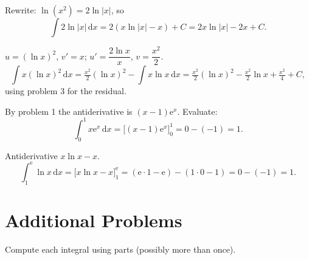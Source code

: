 \begin{solutions}
  \item Rewrite: $\ln(x^{2})=2\ln|x|$, so
        \[
          \int 2\ln|x|\,\mathrm{d}x
            = 2(x\ln|x|-x)+C = 2x\ln|x|-2x+C .
        \]

  \item $u=(\ln x)^{2}$, $v'=x$; $u'=\dfrac{2\ln x}{x}$, $v=\dfrac{x^{2}}{2}$.
        \[
          \int x(\ln x)^{2}\,\mathrm{d}x
            = \tfrac{x^{2}}{2}(\ln x)^{2}-\int x\ln x\,\mathrm{d}x
            = \tfrac{x^{2}}{2}(\ln x)^{2}-\tfrac{x^{2}}{2}\ln x+\tfrac{x^{2}}{4}+C ,
        \]
        using problem 3 for the residual.

  \item By problem 1 the antiderivative is $(x-1)\mathrm{e}^{x}$. Evaluate:
        \[
          \int_{0}^{1} x\mathrm{e}^{x}\,\mathrm{d}x
            = \bigl[(x-1)\mathrm{e}^{x}\bigr]_{0}^{1}
            = 0-(-1)=1 .
        \]

  \item Antiderivative $x\ln x - x$.
        \[
          \int_{1}^{\mathrm{e}} \ln x\,\mathrm{d}x
            = \bigl[x\ln x - x\bigr]_{1}^{\mathrm{e}}
            = (\mathrm{e}\cdot 1-\mathrm{e})-(1\cdot 0-1)
            = 0-(-1)=1 .
        \]
\end{solutions}

\section{Additional Problems}

Compute each integral using parts (possibly more than once).


